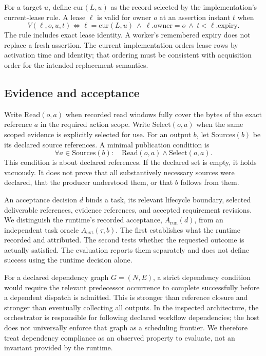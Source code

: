 For a target $u$, define $\mathrm{cur}(L,u)$ as the record selected by the implementation's current-lease rule. A lease $\ell$ is valid for owner $o$ at an assertion instant $t$ when
\begin{equation}\label{eq:lease}
V(\ell,o,u,t) \iff \ell=\mathrm{cur}(L,u)\ \land\ \ell.\mathrm{owner}=o\ \land\ t<\ell.\mathrm{expiry}.
\end{equation}
The rule includes exact lease identity. A worker's remembered expiry does not replace a fresh assertion. The current implementation orders lease rows by activation time and identity; that ordering must be consistent with acquisition order for the intended replacement semantics.

\subsection{Evidence and acceptance}
Write $\mathrm{Read}(o,a)$ when recorded read windows fully cover the bytes of the exact reference $a$ in the required action scope. Write $\mathrm{Select}(o,a)$ when the same scoped evidence is explicitly selected for use. For an output $b$, let $\mathrm{Sources}(b)$ be its declared source references. A minimal publication condition is
\begin{equation}\label{eq:evidence}
\forall a\in\mathrm{Sources}(b):\quad \mathrm{Read}(o,a)\land\mathrm{Select}(o,a).
\end{equation}
This condition is about declared references. If the declared set is empty, it holds vacuously. It does not prove that all substantively necessary sources were declared, that the producer understood them, or that $b$ follows from them.

An acceptance decision $d$ binds a task, its relevant lifecycle boundary, selected deliverable references, evidence references, and accepted requirement revisions. We distinguish the runtime's recorded acceptance, $A_{\mathrm{run}}(d)$, from an independent task oracle $A_{\mathrm{ext}}(\tau,b)$. The first establishes what the runtime recorded and attributed. The second tests whether the requested outcome is actually satisfied. The evaluation reports them separately and does not define success using the runtime decision alone.

For a declared dependency graph $G=(N,E)$, a strict dependency condition would require the relevant predecessor occurrence to complete successfully before a dependent dispatch is admitted. This is stronger than reference closure and stronger than eventually collecting all outputs. In the inspected architecture, the orchestrator is responsible for following declared workflow dependencies; the host does not universally enforce that graph as a scheduling frontier. We therefore treat dependency compliance as an observed property to evaluate, not an invariant provided by the runtime.

